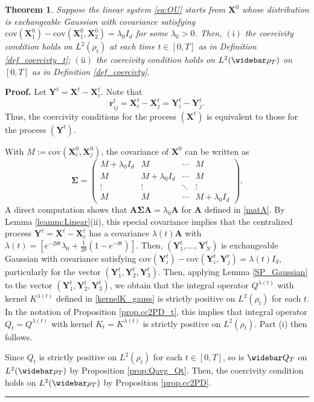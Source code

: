 \documentclass[]{elsarticle}
\newcommand{\wbar}\widebar
\newcommand{\cov}{\mathrm{cov}}
\newcommand{\mbf}[1]{\boldsymbol{#1}}
\newcommand{\br}{\mbf{r}}
\newcommand{\bX}{\mbf{X}}
\newcommand{\bY}{\mbf{Y}}
\newcommand{\btheta}{\mbf{A}}
\newtheorem{theorem}{Theorem}
\newenvironment{proof}[1][Proof]{\noindent\textbf{#1.} }{\ \rule{0.5em}{0.5em}}
\numberwithin{equation}{section}
\numberwithin{theorem}{section}
\begin{document}
 
\begin{theorem} \label{thm_main_OU}
Suppose the linear system \eqref{eq:OU} starts from $\bX^0$ whose distribution is exchangeable Gaussian with covariance satisfying $\cov(\bX_1^0)-\cov(\bX_1^0,\bX_2^0)=\lambda_0 I_d$ for some $\lambda_0>0$. Then, $\mathrm{(i)}$ the coercivity condition holds  on $L^2(\rho_t)$ at each time $t\in [0,T]$ as in Definition {\rm \ref{def_coercivty_t}}; 
$\mathrm{(ii)}$ the coercivity condition holds on $L^2(\wbar \rho_T)$ on $[0,T]$ as in Definition \rm{\ref{def_coercivty}}. 
\end{theorem}
\begin{proof} Let $\bY^t= \bX^t- \bX_c^t$. Note that
\[\br_{ij}^t = \bX^{t}_i- \bX^t_j =\bY^{t}_i- \bY^t_j.\]
Thus,  the coercivity conditions for the process $(\bX^t)$ is equivalent to those for the process $(\bY^t)$. 

With $M:=\cov(\bX_i^0,\bX_j^0)$, the covariance of $\bX^0$ can be written as
\[\mbf\Sigma = 
 \begin{pmatrix}
  M + \lambda_0 I_d& M & \cdots & M  \\
M & M + \lambda_0 I_d & \cdots & M \\
  \vdots  & \vdots  & \ddots & \vdots  \\
M & M & \cdots & M + \lambda_0 I_d 
 \end{pmatrix}.
\]
A direct computation shows that $\btheta\mbf\Sigma \btheta = \lambda_0 \btheta$ for $\btheta$ defined in \eqref{matA}. By Lemma \ref{leamm:Linear}(ii), this special covariance implies that the centralized process $\bY^t= \bX^t- \bX_c^t$ has a covariance $\lambda(t)\btheta$ with $\lambda(t)=\left[e^{-2\theta t}\lambda_0+\frac{1}{2\theta}(1-e^{-\theta t})\right]$. 
Then, $(\bY_1^t,\ldots,\bY_N^t)$ is exchangeable Gaussian with covariance satisfying $\cov(\bY_i^t)-\cov(\bY_i^t,\bY_j^t)=\lambda(t) I_d$, particularly for the vector $(\bY^t_1,\bY^t_2,\bY^t_3)$.  Then, applying Lemma \ref{SP_Gaussian} to the vector $(\bY^t_1,\bY^t_2,\bY^t_3)$, we obtain that the integral operator $Q^{\lambda(t)}$ with kernel $K^{\lambda(t)}$ defined in \eqref{kernelK_gauss} is strictly positive on $L^2(\rho_t)$ for each $t$.  In the notation of Proposition  \ref{prop.cc2PD_t}, this implies that integral operator $Q_t= Q^{\lambda(t)}$ with kernel  $K_t= K^{\lambda(t)}$ is strictly positive on $L^2(\rho_t)$. Part (i) then follows.   

Since $Q_t$ is strictly positive on $L^2(\rho_t)$ for each $t\in [0,T]$,  so is $\wbar Q_T$ on $L^2(\wbar \rho_T)$ by Proposition \ref{prop:Qavg_Qt}. Then, the coercivity condition holds on $L^2(\wbar \rho_T)$ by Proposition \ref{prop.cc2PD}. 
 \end{proof}
\end{document}
